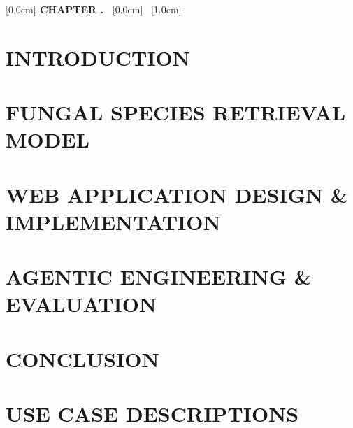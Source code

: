 \documentclass[a4paper,13pt,3p,twoside]{report}
\begin{document}



\newpage


\newpage


\newpage
\renewcommand*\contentsname{TABLE OF CONTENTS}
[0.0cm]{\bfseries\vspace{0.3cm}}{{\bfseries{\scshape} CHAPTER \thecontentslabel.\ }}{}{\contentspage}
[0.0cm]{\vspace{0.3cm}}{\thecontentslabel \ }{}{\contentspage}
[1.0cm]{\vspace{0.3cm}}{\thecontentslabel \ }{}{\contentspage}

\tableofcontents
\thispagestyle{empty}
\cleardoublepage

\renewcommand{\listfigurename}{LIST OF FIGURES}
{\let\oldnumberline\numberline \renewcommand{\numberline}{Figure~\oldnumberline} \listoffigures}
\newpage

\renewcommand{\listtablename}{LIST OF TABLES}
{\let\oldnumberline\numberline \renewcommand{\numberline}{Table~\oldnumberline} \listoftables}
\newpage

\glsaddall
\renewcommand*{\acronymname}{LIST OF ABBREVIATIONS}
\printnoidxglossaries

\newpage
{}
\pagestyle{fancy}
\fancyhf{}
\fancyhead[RE, LO]{\leftmark}
\fancyfoot[RE, LO]{\thepage}

\chapter{INTRODUCTION}


\chapter{FUNGAL SPECIES RETRIEVAL MODEL}


\chapter{WEB APPLICATION DESIGN \& IMPLEMENTATION}


\chapter{AGENTIC ENGINEERING \& EVALUATION}


\chapter{CONCLUSION}


\newpage
\printbibliography
{}

\appendixpage
\appendices
\chapter{USE CASE DESCRIPTIONS}

\end{document}
